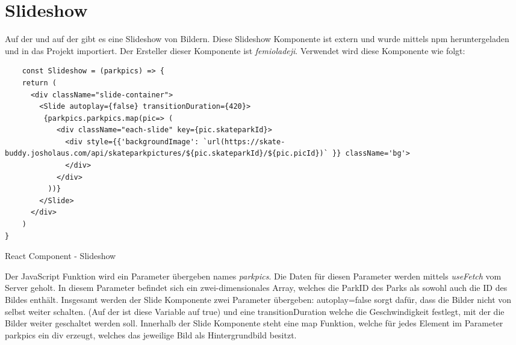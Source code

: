 \section{Slideshow}
\label{slideshow}

Auf der \underline{} und auf der \underline{} gibt es eine Slideshow von Bildern.
Diese Slideshow Komponente ist extern und wurde mittels npm heruntergeladen und in das 
Projekt importiert. Der Ersteller dieser Komponente ist \textit{femioladeji}. Verwendet wird diese 
Komponente wie folgt:

\begin{code}[htp]
\begin{lstlisting}
    const Slideshow = (parkpics) => {
    return (
      <div className="slide-container">
        <Slide autoplay={false} transitionDuration={420}>
         {parkpics.parkpics.map(pic=> (
            <div className="each-slide" key={pic.skateparkId}>
              <div style={{'backgroundImage': `url(https://skate-buddy.josholaus.com/api/skateparkpictures/${pic.skateparkId}/${pic.picId})` }} className='bg'>
              </div>
            </div>
          ))} 
        </Slide>
      </div>
    )
}
\end{lstlisting}
\caption{React Component - Slideshow}
\end{code}

Der JavaScript Funktion wird ein Parameter übergeben names \textit{parkpics}. Die 
Daten für diesen Parameter werden mittels \textit{useFetch} vom Server geholt. In diesem Parameter 
befindet sich ein zwei-dimensionales Array, welches die ParkID des Parks als sowohl auch die ID des 
Bildes enthält. Insgesamt werden der Slide Komponente zwei Parameter übergeben: autoplay={false} sorgt
dafür, dass die Bilder nicht von selbst weiter schalten. (Auf der \underline{} ist diese Variable auf true) und
eine transitionDuration welche die Geschwindigkeit festlegt, mit der die Bilder weiter geschaltet werden soll.
Innerhalb der Slide Komponente steht eine map Funktion, welche für jedes Element im Parameter parkpics 
ein div erzeugt, welches das jeweilige Bild als Hintergrundbild besitzt. 



